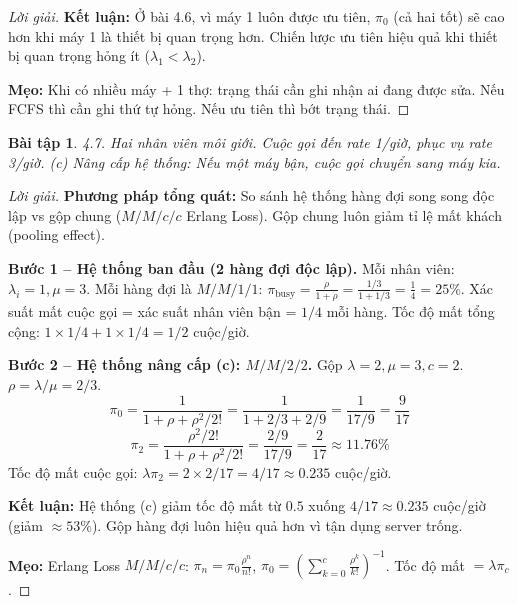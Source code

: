 \documentclass[8pt,a4paper]{article}
\newtheorem{exercise}{Bài tập}
\newenvironment{solution}{\begin{proof}[Lời giải]}{\end{proof}}
\begin{document}
\begin{solution}
\textbf{Kết luận:} Ở bài 4.6, vì máy 1 luôn được ưu tiên, $\pi_0$ (cả hai tốt) sẽ cao hơn khi máy 1 là thiết bị quan trọng hơn. Chiến lược ưu tiên hiệu quả khi thiết bị quan trọng hỏng ít ($\lambda_1 < \lambda_2$).

\textbf{Mẹo:} Khi có nhiều máy + 1 thợ: trạng thái cần ghi nhận ai đang được sửa. Nếu FCFS thì cần ghi thứ tự hỏng. Nếu ưu tiên thì bớt trạng thái.
\end{solution}

\begin{exercise}
4.7. Hai nhân viên môi giới. Cuộc gọi đến rate 1/giờ, phục vụ rate 3/giờ. 
(c) Nâng cấp hệ thống: Nếu một máy bận, cuộc gọi chuyển sang máy kia.
\end{exercise}
\begin{solution}
\textbf{Phương pháp tổng quát:} So sánh hệ thống hàng đợi song song độc lập vs gộp chung ($M/M/c/c$ Erlang Loss). Gộp chung luôn giảm tỉ lệ mất khách (pooling effect).

\textbf{Bước 1 -- Hệ thống ban đầu (2 hàng đợi độc lập).} Mỗi nhân viên: $\lambda_i = 1, \mu = 3$.
Mỗi hàng đợi là $M/M/1/1$: $\pi_{\text{busy}} = \frac{\rho}{1+\rho} = \frac{1/3}{1+1/3} = \frac{1}{4} = 25\%$.
Xác suất mất cuộc gọi = xác suất nhân viên bận = $1/4$ mỗi hàng.
Tốc độ mất tổng cộng: $1 \times 1/4 + 1 \times 1/4 = 1/2$ cuộc/giờ.

\textbf{Bước 2 -- Hệ thống nâng cấp (c): $M/M/2/2$.} Gộp $\lambda = 2, \mu = 3, c = 2$. $\rho = \lambda/\mu = 2/3$.
\[
\pi_0 = \frac{1}{1 + \rho + \rho^2/2!} = \frac{1}{1 + 2/3 + 2/9} = \frac{1}{17/9} = \frac{9}{17}
\]
\[
\pi_2 = \frac{\rho^2/2!}{1 + \rho + \rho^2/2!} = \frac{2/9}{17/9} = \frac{2}{17} \approx 11.76\%
\]
Tốc độ mất cuộc gọi: $\lambda \pi_2 = 2 \times 2/17 = 4/17 \approx 0.235$ cuộc/giờ.

\textbf{Kết luận:} Hệ thống (c) giảm tốc độ mất từ $0.5$ xuống $\boxed{4/17 \approx 0.235}$ cuộc/giờ (giảm $\approx 53\%$). Gộp hàng đợi luôn hiệu quả hơn vì tận dụng server trống.

\textbf{Mẹo:} Erlang Loss $M/M/c/c$: $\pi_n = \pi_0 \frac{\rho^n}{n!}$, $\pi_0 = \left(\sum_{k=0}^c \frac{\rho^k}{k!}\right)^{-1}$. Tốc độ mất $= \lambda \pi_c$.
\end{solution}
\end{document}
